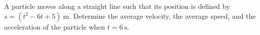 A particle moves along a straight line such that its position is defined by $s = (t^2 - 6t + 5)\ \text{m}$. Determine the average velocity, the average speed, and the acceleration of the particle when $t = 6\ \text{s}$.
